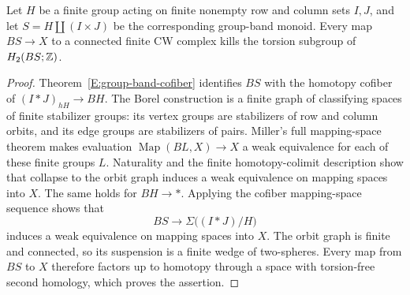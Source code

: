 \begin{lemma}
\label{B:group-band-torsion-killed}
Let $H$ be a finite group acting on finite nonempty row and column
sets $I,J$, and let $S=H\amalg(I\times J)$ be the corresponding
group-band monoid. Every map $BS\to X$ to a connected finite CW
complex kills the torsion subgroup of $H_2(BS;\mathbb Z)$.
\end{lemma}
\begin{proof}
Theorem~\ref{E:group-band-cofiber} identifies $BS$ with the homotopy
cofiber of $(I*J)_{hH}\to BH$. The Borel construction is a finite
graph of classifying spaces of finite stabilizer groups: its vertex
groups are stabilizers of row and column orbits, and its edge groups
are stabilizers of pairs. Miller's full mapping-space theorem
\cite[Theorem~A]{miller1984} makes evaluation
$\operatorname{Map}(BL,X)\to X$ a weak equivalence for each of
these finite groups $L$. Naturality and the finite homotopy-colimit
description show that collapse to the orbit graph induces a weak
equivalence on mapping spaces into $X$. The same holds for
$BH\to *$. Applying the cofiber mapping-space sequence shows that
\[
 BS\longrightarrow\Sigma\bigl((I*J)/H\bigr)
\]
induces a weak equivalence on mapping spaces into $X$. The orbit
graph is finite and connected, so its suspension is a finite wedge
of two-spheres. Every map from $BS$ to $X$ therefore factors up to
homotopy through a space with torsion-free second homology, which
proves the assertion.
\end{proof}

